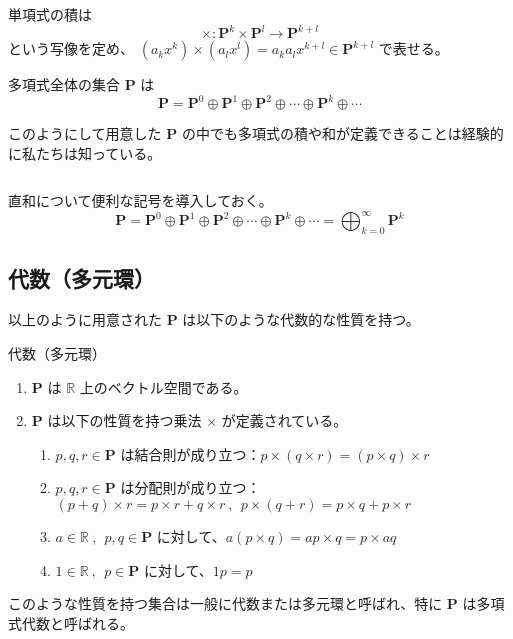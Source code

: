 \documentclass[uplatex,a4j,12pt,dvipdfmx]{jsarticle}
\begin{document}
単項式の積は
$$
	\times : \mathbf{P}^{k} \times \mathbf{P}^{l} \to \mathbf{P}^{k+l}
$$
という写像を定め、
$ (a_{k} x^{k}) \times (a_{l} x^{l}) = a_{k} a_{l} x^{k+l} \in \mathbf{P}^{k+l}$ で表せる。

多項式全体の集合 $\mathbf{P}$ は
$$
	\mathbf{P}
	=
	\mathbf{P}^{0} \oplus \mathbf{P}^{1} \oplus \mathbf{P}^{2} \oplus \cdots \oplus \mathbf{P}^{k} \oplus \cdots
$$

このようにして用意した $\mathbf{P}$ の中でも多項式の積や和が定義できることは経験的に私たちは知っている。

${}$

直和について便利な記号を導入しておく。
$$
	\mathbf{P}
	=
	\mathbf{P}^{0} \oplus \mathbf{P}^{1} \oplus \mathbf{P}^{2} \oplus \cdots \oplus \mathbf{P}^{k} \oplus \cdots
	=
	\displaystyle \bigoplus_{k=0}^{\infty} \mathbf{P}^{k}
$$

\subsection{代数（多元環）}

以上のように用意された $\mathbf{P}$ は以下のような代数的な性質を持つ。

\begin{itembox}[l]{代数（多元環）}
	\begin{enumerate}
		\item $\mathbf{P}$ は $\mathbb{R}$ 上のベクトル空間である。
		\item $\mathbf{P}$ は以下の性質を持つ乗法 $\times$ が定義されている。
		      \begin{enumerate}
			      \item $p,q,r \in \mathbf{P}$ は結合則が成り立つ：$p \times (q \times r) = (p \times q) \times r$
			      \item $p,q,r \in \mathbf{P}$ は分配則が成り立つ：$(p + q) \times r = p \times r + q \times r \ , \ \ p \times (q + r) = p \times q + p \times r$
			      \item $a \in \mathbb{R} \ , \ \ p,q \in \mathbf{P}$ に対して、$a (p \times q) = a p \times q = p \times a q$
			      \item $1 \in \mathbb{R} \ , \ \ p \in \mathbf{P}$ に対して、$1p=p$
		      \end{enumerate}
	\end{enumerate}
\end{itembox}

このような性質を持つ集合は一般に代数または多元環と呼ばれ、特に $\mathbf{P}$ は多項式代数と呼ばれる。
\end{document}
